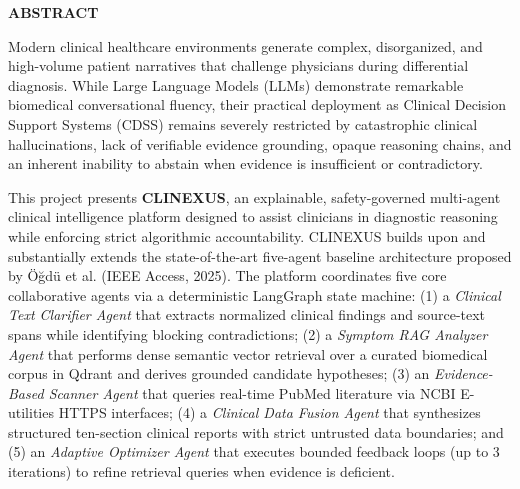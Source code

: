 \documentclass[12pt,a4paper]{report}
\begin{document}
\newpage
\begin{center}
    \textbf{\Large ABSTRACT}\\[0.8cm]
\end{center}

Modern clinical healthcare environments generate complex, disorganized, and high-volume patient narratives that challenge physicians during differential diagnosis. While Large Language Models (LLMs) demonstrate remarkable biomedical conversational fluency, their practical deployment as Clinical Decision Support Systems (CDSS) remains severely restricted by catastrophic clinical hallucinations, lack of verifiable evidence grounding, opaque reasoning chains, and an inherent inability to abstain when evidence is insufficient or contradictory. 

This project presents \textbf{CLINEXUS}, an explainable, safety-governed multi-agent clinical intelligence platform designed to assist clinicians in diagnostic reasoning while enforcing strict algorithmic accountability. CLINEXUS builds upon and substantially extends the state-of-the-art five-agent baseline architecture proposed by Öğdü et al. (IEEE Access, 2025). The platform coordinates five core collaborative agents via a deterministic LangGraph state machine: (1) a \textit{Clinical Text Clarifier Agent} that extracts normalized clinical findings and source-text spans while identifying blocking contradictions; (2) a \textit{Symptom RAG Analyzer Agent} that performs dense semantic vector retrieval over a curated biomedical corpus in Qdrant and derives grounded candidate hypotheses; (3) an \textit{Evidence-Based Scanner Agent} that queries real-time PubMed literature via NCBI E-utilities HTTPS interfaces; (4) a \textit{Clinical Data Fusion Agent} that synthesizes structured ten-section clinical reports with strict untrusted data boundaries; and (5) an \textit{Adaptive Optimizer Agent} that executes bounded feedback loops (up to 3 iterations) to refine retrieval queries when evidence is deficient.
\end{document}
